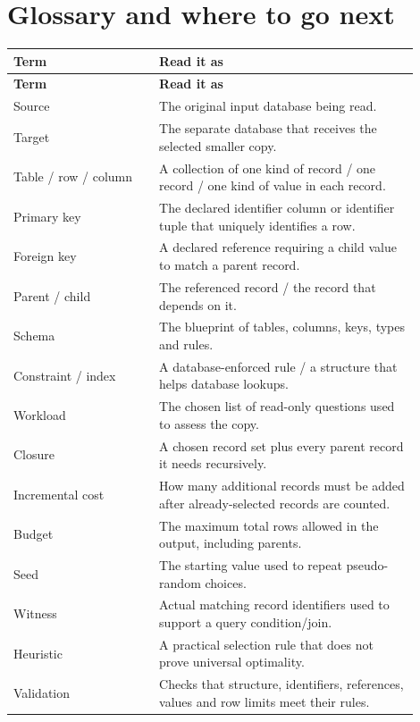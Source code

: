 \chapter{Glossary and where to go next}

\begin{longtable}{>{\RaggedRight\arraybackslash}p{0.32\linewidth}>{\RaggedRight\arraybackslash}p{0.58\linewidth}}
\toprule
\textbf{Term} & \textbf{Read it as} \\
\midrule
\endfirsthead
\toprule
\textbf{Term} & \textbf{Read it as} \\
\midrule
\endhead
Source & The original input database being read. \\[5pt]
Target & The separate database that receives the selected smaller copy. \\[5pt]
Table / row / column & A collection of one kind of record / one record / one kind of value in each record. \\[5pt]
Primary key & The declared identifier column or identifier tuple that uniquely identifies a row. \\[5pt]
Foreign key & A declared reference requiring a child value to match a parent record. \\[5pt]
Parent / child & The referenced record / the record that depends on it. \\[5pt]
Schema & The blueprint of tables, columns, keys, types and rules. \\[5pt]
Constraint / index & A database-enforced rule / a structure that helps database lookups. \\[5pt]
Workload & The chosen list of read-only questions used to assess the copy. \\[5pt]
Closure & A chosen record set plus every parent record it needs recursively. \\[5pt]
Incremental cost & How many additional records must be added after already-selected records are counted. \\[5pt]
Budget & The maximum total rows allowed in the output, including parents. \\[5pt]
Seed & The starting value used to repeat pseudo-random choices. \\[5pt]
Witness & Actual matching record identifiers used to support a query condition/join. \\[5pt]
Heuristic & A practical selection rule that does not prove universal optimality. \\[5pt]
Validation & Checks that structure, identifiers, references, values and row limits meet their rules. \\[5pt]

\end{longtable}
